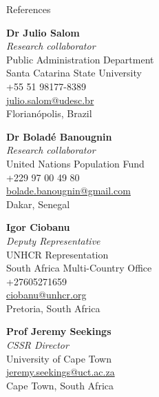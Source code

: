 \begin{rSection}{References}

\begin{multicols}{2}

{\textbf{Dr Julio Salom}}\\
{\textit{Research collaborator}}\\
{Public Administration Department}\\
{Santa Catarina State University}\\
{+55 51 98177-8389}\\
\href{mailto:julio.salom@udesc.br}{julio.salom@udesc.br}\\
{Florianópolis, Brazil}\par 

{\textbf{Dr Boladé Banougnin}}\\
{\textit{Research collaborator}}\\
{United Nations Population Fund}\\
{+229 97 00 49 80}\\
\href{mailto:bolade.banougnin@gmail.com}{bolade.banougnin@gmail.com}\\
{Dakar, Senegal}\par 


{\textbf{Igor Ciobanu}}\\
{\textit{Deputy Representative}}\\
{UNHCR Representation}\\
{South Africa Multi-Country Office}\\
{+27605271659}\\
\href{mailto:ciobanu@unhcr.org}{ciobanu@unhcr.org}\\
{Pretoria, South Africa}\par 

{\textbf{Prof Jeremy Seekings}}\\
{\textit{CSSR Director}}\\
{University of Cape Town}\\
\href{mailto:jeremy.seekings@uct.ac.za}{jeremy.seekings@uct.ac.za}\\
{Cape Town, South Africa}\par


\end{multicols}
\end{rSection}
